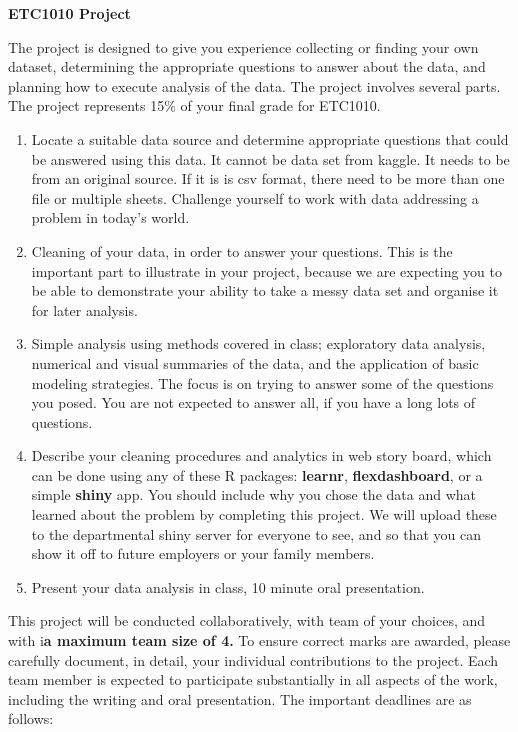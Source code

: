 \documentclass{article}
\begin{document}
\centerline{\Large\bf ETC1010 Project}
\bigskip

The project is designed to give you experience collecting or finding your own dataset, determining the
appropriate questions to answer about the data, and planning how to execute analysis of the data.  The project involves several parts. The project represents 15\% of your final grade for ETC1010.

\begin{enumerate} \itemsep 0in
\item Locate a suitable data source and determine appropriate questions that could be answered using this data. It cannot be data set from kaggle. It needs to be from an original source. If it is is csv format, there need to be more than one file or multiple sheets. Challenge yourself to work with data addressing a problem in today's world.
\item Cleaning of your data, in order to answer your questions. This is the important part to illustrate in your project, because we are expecting you to be able to demonstrate your ability to take a messy data set and organise it for later analysis.
\item Simple analysis using methods covered in class; exploratory data analysis, numerical and visual summaries of the data, and the application of basic modeling strategies. The focus is on trying to answer some of the questions you posed. You are not expected to answer all, if you have a long lots of questions. 
\item Describe your cleaning procedures and analytics in web story board, which can be done using any of these R packages: {\bf learnr}, {\bf flexdashboard}, or a simple {\bf shiny} app. You  should include why you chose the data and what learned about the problem by completing this project. We will upload these to the departmental shiny server for everyone to see, and so that you can show it off to future employers or your family members.
\item Present your data analysis in class,  10 minute oral presentation.
\end{enumerate}

This project will be conducted collaboratively, with team of your choices, and with  i\textbf{a maximum team size of 4.} To ensure correct marks are awarded, please carefully document, in detail, your individual contributions to the project. Each team member is expected to participate substantially in all aspects of the work, including the writing and oral presentation. The important deadlines are as follows: 
\end{document}
